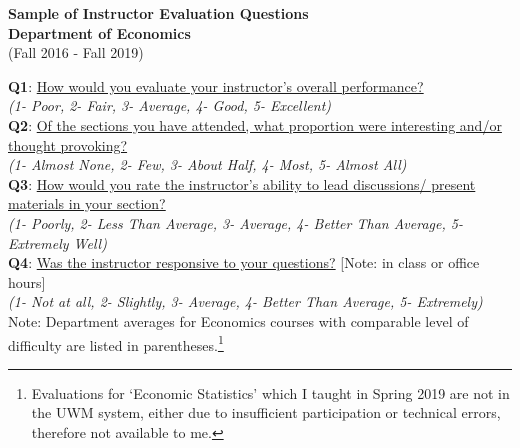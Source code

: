 \documentclass[a4paper,11pt]{article}
\begin{document}
\begin{center}
 {\Large \textbf{Sample of Instructor Evaluation Questions \\ Department of Economics}} \\
 (Fall 2016 - Fall 2019) \\
 \end{center}


\textbf{Q1}: \ul{How would you evaluate your instructor's overall performance?} \\
\textit{(1- Poor, 2- Fair, 3- Average, 4- Good, 5- Excellent)} \\
\textbf{Q2}: \ul{Of the sections you have attended, what proportion were interesting and/or thought provoking?} \\
\textit{(1- Almost None, 2- Few, 3- About Half, 4- Most, 5- Almost All)} \\
\textbf{Q3}: \ul{How would you rate the instructor's ability to lead discussions/ present materials in your section?} \\
\textit{(1- Poorly, 2- Less Than Average, 3- Average, 4- Better Than Average, 5- Extremely Well)} \\
\textbf{Q4}: \ul{Was the instructor responsive to your questions?} [Note: in class or office hours] \\
\textit{(1- Not at all, 2- Slightly, 3- Average, 4- Better Than Average, 5- Extremely)} \\



Note: Department averages for Economics courses with comparable level of difficulty are listed in parentheses.\footnote{Evaluations for `Economic Statistics' which I taught in Spring 2019 are not in the UWM system, either due to insufficient participation or technical errors, therefore not available to me.} 
\end{document}
